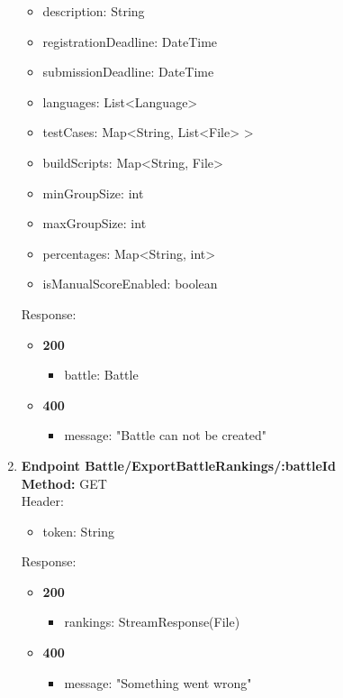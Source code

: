 \begin{enumerate}
\begin{itemize}
        \item description: String
        \item registrationDeadline: DateTime
        \item submissionDeadline: DateTime
        \item languages: List<Language>
        \item testCases: Map<String, List<File> >
        \item buildScripts: Map<String, File>
        \item minGroupSize: int
        \item maxGroupSize: int
        \item percentages: Map<String, int>
        \item isManualScoreEnabled: boolean
    \end{itemize}
    Response:\\
    \begin{itemize}
        \item \textbf{200} \\
        \begin{itemize}
            \item battle: Battle
        \end{itemize}
        \item \textbf{400} \\
        \begin{itemize}
            \item message: "Battle can not be created"
        \end{itemize}
    \end{itemize}
    \item \textbf{Endpoint Battle/ExportBattleRankings/:battleId} \\
    \textbf{Method:} GET \\
    Header:\\
    \begin{itemize}
        \item token: String
    \end{itemize}
    Response:\\
    \begin{itemize}
        \item \textbf{200} \\
        \begin{itemize}
            \item rankings: StreamResponse(File)
        \end{itemize}
        \item \textbf{400} \\
        \begin{itemize}
            \item message: "Something went wrong"
        \end{itemize}
    \end{itemize}
\end{enumerate}
\newpage
